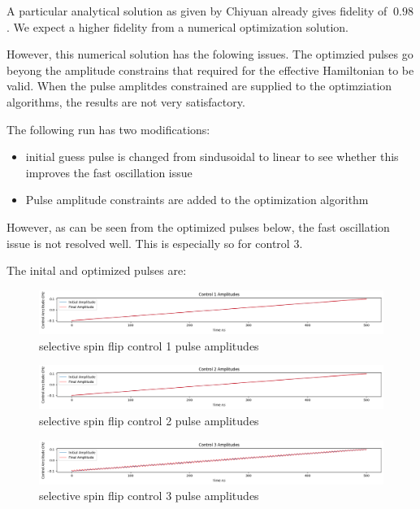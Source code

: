 \documentclass[12pt]{report}
\begin{document}
A particular analytical solution as given by Chiyuan already gives fidelity of $~0.98$.
            We expect a higher fidelity from a numerical optimization solution. 
\par
However, this numerical solution has the folowing issues.
The optimzied pulses go beyong the amplitude constrains that required for the effective Hamiltonian to be valid. 
When the pulse amplitdes constrained are supplied to the optimziation algorithms, the results are not very satisfactory. 
\par
The following run has two modifications: 
\begin{itemize}
    \item initial guess pulse is changed from sindusoidal to linear to see whether this improves the fast oscillation issue
    \item Pulse amplitude constraints are added to the optimization algorithm
\end{itemize}
However, as can be seen from the optimized pulses below, the fast oscillation issue is not resolved well. 
This is especially so for control 3.
\par
The inital and optimized pulses are: 
\begin{figure}[H]
    \centering
    \includegraphics[width=0.95\linewidth]{selective_spin_flip_GRAPE_500,_100_000_LIN_constraints_control1.png}
    \caption{selective spin flip control 1 pulse amplitudes}
    \label{fig:selective_spin_flip_constrains_control1}
\end{figure}
\begin{figure}[H]
    \centering
    \includegraphics[width=0.95\linewidth]{selective_spin_flip_GRAPE_500,_100_000_LIN_constraints_control2.png}
    \caption{selective spin flip control 2 pulse amplitudes}
    \label{fig:selective_spin_flip_constrains_control2}
\end{figure}
\begin{figure}[H]
    \centering
    \includegraphics[width=0.95\linewidth]{selective_spin_flip_GRAPE_500,_100_000_LIN_constraints_control3.png}
    \caption{selective spin flip control 3 pulse amplitudes}
    \label{fig:selective_spin_flip_constrains_control3}
\end{figure}
\end{document}
